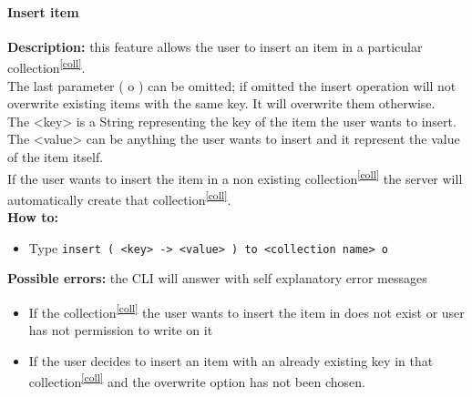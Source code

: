 \documentclass{scalatekids-article}
\begin{document}
\paragraph{Insert item}
\label{sec:insertitem}
\textbf{Description:} this feature allows the user to insert an item in a particular collection\textsuperscript{\ref{coll}}.\\
The last parameter ( o ) can be omitted; if omitted the insert operation will not overwrite existing items with the same key. It will overwrite them otherwise. \\
The <key> is a String representing the key of the item the user wants to insert.\\
The <value> can be anything the user wants to insert and it represent the value of the item itself.\\
If the user wants to insert the item in a non existing collection\textsuperscript{\ref{coll}} the server
will automatically create that collection\textsuperscript{\ref{coll}}.\\
\textbf{How to:}
\begin{itemize}
\item Type \texttt{insert ( <key> -> <value> ) to <collection name> o}
\end{itemize}
\textbf{Possible errors:} the CLI will answer with self explanatory error messages
\begin{itemize}
\item If the collection\textsuperscript{\ref{coll}} the user wants to insert the item in does not exist or user has not permission to write on it
\item If the user decides to insert an item with an already existing key in that collection\textsuperscript{\ref{coll}} and the overwrite option has not been chosen.
\end{itemize}
\end{document}
